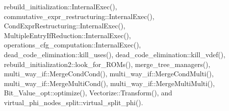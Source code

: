 rebuild\+\_\+initialization\+::\+Internal\+Exec(), commutative\+\_\+expr\+\_\+restructuring\+::\+Internal\+Exec(), Cond\+Expr\+Restructuring\+::\+Internal\+Exec(), Multiple\+Entry\+If\+Reduction\+::\+Internal\+Exec(), operations\+\_\+cfg\+\_\+computation\+::\+Internal\+Exec(), dead\+\_\+code\+\_\+elimination\+::kill\+\_\+uses(), dead\+\_\+code\+\_\+elimination\+::kill\+\_\+vdef(), rebuild\+\_\+initialization2\+::look\+\_\+for\+\_\+\+R\+O\+Ms(), merge\+\_\+tree\+\_\+managers(), multi\+\_\+way\+\_\+if\+::\+Merge\+Cond\+Cond(), multi\+\_\+way\+\_\+if\+::\+Merge\+Cond\+Multi(), multi\+\_\+way\+\_\+if\+::\+Merge\+Multi\+Cond(), multi\+\_\+way\+\_\+if\+::\+Merge\+Multi\+Multi(), Bit\+\_\+\+Value\+\_\+opt\+::optimize(), Vectorize\+::\+Transform(), and virtual\+\_\+phi\+\_\+nodes\+\_\+split\+::virtual\+\_\+split\+\_\+phi().

